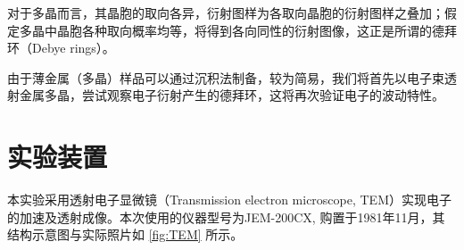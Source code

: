\documentclass[aps,pre,12pt,preprint,%
	onecolumn,showpacs,showkeys,nofootinbib]{revtex4-1}
\begin{document}
	对于多晶而言，其晶胞的取向各异，衍射图样为各取向晶胞的衍射图样之叠加；假定多晶中晶胞各种取向概率均等，将得到各向同性的衍射图像，这正是所谓的德拜环（Debye rings）。
	
	由于薄金属（多晶）样品可以通过沉积法制备，较为简易，我们将首先以电子束透射金属多晶，尝试观察电子衍射产生的德拜环，这将再次验证电子的波动特性。
\section{实验装置}
	本实验采用透射电子显微镜（Transmission electron microscope, TEM）实现电子的加速及透射成像。本次使用的仪器型号为JEM-200CX, 购置于1981年11月，其结构示意图与实际照片如 \autoref{fig:TEM} 所示。
	
\end{document}
